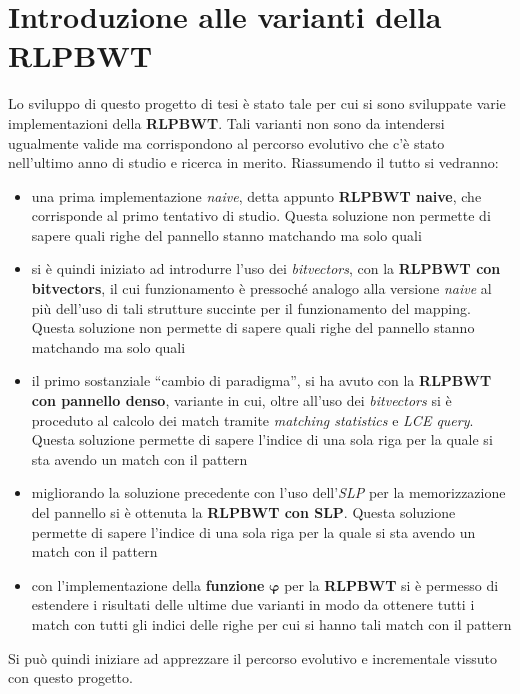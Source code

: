 \section{Introduzione alle varianti della RLPBWT}
Lo sviluppo di questo progetto di tesi è stato tale per cui si sono sviluppate
varie implementazioni della \textbf{RLPBWT}. Tali varianti non sono da
intendersi ugualmente valide ma corrispondono al percorso evolutivo che c'è
stato nell'ultimo anno di studio e ricerca in merito. Riassumendo il tutto si
vedranno:
\begin{itemize}
  \item una prima implementazione \textit{naive}, detta appunto \textbf{RLPBWT
    naive}, che corrisponde al primo tentativo di studio. Questa soluzione non
  permette di sapere quali righe del pannello stanno matchando ma solo quali
  \item si è quindi iniziato ad introdurre l'uso dei \textit{bitvectors}, con la
  \textbf{RLPBWT con bitvectors}, il cui funzionamento è pressoché analogo alla
  versione \textit{naive} al più dell'uso di tali strutture succinte per il
  funzionamento del mapping. Questa soluzione non
  permette di sapere quali righe del pannello stanno matchando ma solo quali
  \item il primo sostanziale ``cambio di paradigma'', si ha avuto con la
  \textbf{RLPBWT con pannello denso}, variante in cui, oltre all'uso dei
  \textit{bitvectors} si è proceduto al calcolo dei match tramite
  \textit{matching statistics} e \textit{LCE query}. Questa soluzione permette
  di sapere l'indice di una sola riga per la quale si sta avendo un match con il
  pattern 
  \item migliorando la soluzione precedente con l'uso dell'\textit{SLP} per la
  memorizzazione del pannello si è ottenuta la \textbf{RLPBWT con SLP}. Questa
  soluzione permette di sapere l'indice di una sola riga per la quale si sta
  avendo un match con il pattern 
  \item con l'implementazione della \textbf{funzione} $\mathbf{\varphi}$ per la
  \textbf{RLPBWT} si è permesso di estendere i risultati delle ultime due
  varianti in modo da ottenere tutti i match con tutti gli indici delle righe
  per cui si hanno tali match con il pattern
\end{itemize}
Si può quindi iniziare ad apprezzare il percorso evolutivo e incrementale
vissuto con questo progetto.
